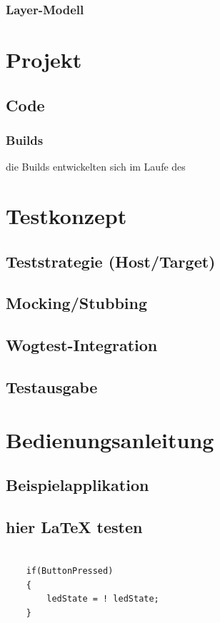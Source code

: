 \documentclass[12pt,a4paper]{article}
\begin{document}
\subsubsection{Layer-Modell}

\newpage

\section{Projekt}
\subsection{Code}
\subsubsection{Builds}
die Builds entwickelten sich im Laufe des
\


\newpage

\section{Testkonzept}
\subsection{Teststrategie (Host/Target)}
\subsection{Mocking/Stubbing}
\subsection{Wogtest-Integration}
\subsection{Testausgabe}

\newpage

\section{Bedienungsanleitung}
\subsection{Beispielapplikation}
\subsection{hier LaTeX testen}
\begin{verbatim}

    if(ButtonPressed)
    {
        ledState = ! ledState;
    }

\end{verbatim}
\end{document}
